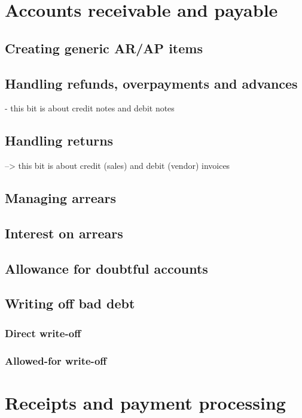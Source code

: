 \chapter{Accounts receivable and payable}

\section{Creating generic AR/AP items}

\section{Handling refunds, overpayments and advances}

- this bit is about credit notes and debit notes

\section{Handling returns}

--> this bit is about credit (sales) and debit (vendor) invoices

\section{Managing arrears}

\section{Interest on arrears}

\section{Allowance for doubtful accounts}

\section{Writing off bad debt}

\subsection{Direct write-off}

\subsection{Allowed-for write-off}


\chapter{Receipts and payment processing}


